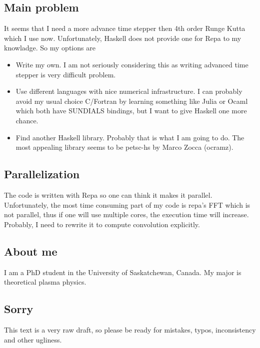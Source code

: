 \documentclass[preprint,aip,pop]{article}
\begin{document}
\subsection{Main problem}
It seems that I need a more advance time stepper then 4th order Runge Kutta
which I use now. Unfortunately, Haskell does not provide one for Repa to my
knowladge. So my options are
\begin{itemize}
\item Write my own. I am not seriously considering this as writing advanced
  time stepper is very difficult problem.
 \item Use different languages with nice numerical infrastructure. I can
   probably avoid my usual choice C/Fortran by learning something like Julia or
   Ocaml which both have SUNDIALS bindings, but I want to give Haskell one more chance.
 \item Find another Haskell library. Probably that is what I am going to do. The
   most appealing library seems to be petsc-hs by Marco Zocca (ocramz).
\end{itemize}
\subsection{Parallelization}
The code is written with Repa so one can think it makes it parallel.
Unfortunately, the most time consuming part of my code is repa's FFT which is
not parallel, thus if one will use multiple cores, the execution time will increase.
Probably, I need to rewrite it to compute convolution explicitly.
\subsection{About me}
I am a PhD student in the University of Saskatchewan, Canada. My major is
theoretical plasma physics. 
\subsection{Sorry}
This text is a very raw draft, so please be ready for mistakes, typos,
inconsistency and other ugliness.
\end{document}
